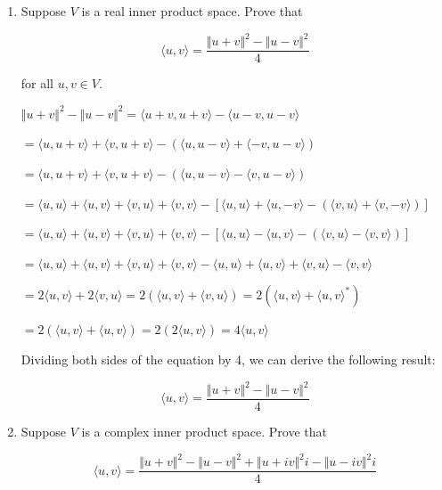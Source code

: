 \documentclass[fleqn]{article}
\makeatletter
\newenvironment{equationCenter}{\@fleqnfalse\begin{equation*}}{\end{equation*}}
\makeatother
\begin{document}
\begin{enumerate}[nolistsep]
			\item Suppose $V$ is a real inner product space. Prove that
			
				\begin{equationCenter}
					\langle u, v\rangle = \frac{{\Vert u + v \Vert}^2 - {\Vert u - v \Vert}^2}{4}
				\end{equationCenter}
				
				for all $u, v \in V$.
				
				${\Vert u + v \Vert}^2 - {\Vert u - v \Vert}^2 = \langle u + v, u + v \rangle - \langle u - v, u - v \rangle$
				
				$ = \langle u, u + v \rangle + \langle v, u + v \rangle - (\langle u, u - v\rangle + \langle -v, u - v \rangle)$
				
				$ = \langle u, u + v \rangle + \langle v, u + v \rangle - (\langle u, u - v\rangle - \langle v, u - v \rangle)$
					
				$ = \langle u, u \rangle + \langle u, v \rangle + \langle v, u \rangle + \langle v, v \rangle - [\langle u, u\rangle + \langle u, -v\rangle - (\langle v, u \rangle + \langle v, -v \rangle)]$
				
				$ = \langle u, u \rangle + \langle u, v \rangle + \langle v, u \rangle + \langle v, v \rangle - [\langle u, u\rangle - \langle u, v\rangle - (\langle v, u \rangle - \langle v, v \rangle)]$
				
				$ = \langle u, u \rangle + \langle u, v \rangle + \langle v, u \rangle + \langle v, v \rangle - \langle u, u\rangle + \langle u, v\rangle + \langle v, u \rangle - \langle v, v \rangle$
				
				$ = 2\langle u, v \rangle + 2 \langle v, u \rangle = 2(\langle u, v \rangle + \langle v, u \rangle) = 2(\langle u, v \rangle + {\langle u, v \rangle}^*)$
				
				$ = 2(\langle u, v \rangle + \langle u, v \rangle) = 2(2\langle u, v \rangle) = 4\langle u, v \rangle$
				
				Dividing both sides of the equation by 4, we can derive the following result:
				
				\begin{equation*}
					\langle u, v\rangle = \frac{{\Vert u + v \Vert}^2 - {\Vert u - v \Vert}^2}{4}
				\end{equation*}
				
			\item Suppose $V$ is a complex inner product space. Prove that
			
				\begin{equationCenter}
					\langle u, v \rangle = \frac{{\Vert u + v \Vert}^2 - {\Vert u - v \Vert}^2 + {\Vert u + iv \Vert}^2i - {\Vert u - iv \Vert}^2i}{4}
				\end{equationCenter}
				

\end{enumerate}
\end{document}
